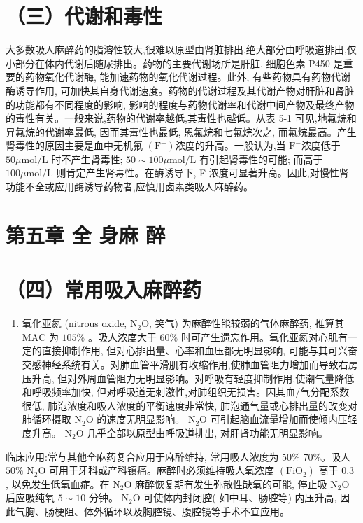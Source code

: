 \documentclass[10pt]{article}
\begin{document}
\section*{（三）代谢和毒性}
大多数吸人麻醉药的脂溶性较大,很难以原型由肾脏排出,绝大部分由呼吸道排出,仅小部分在体内代谢后随尿排出。药物的主要代谢场所是肝脏, 细胞色素 P450 是重要的药物氧化代谢酶, 能加速药物的氧化代谢过程。此外, 有些药物具有药物代谢酶诱导作用, 可加快其自身代谢速度。药物的代谢过程及其代谢产物对肝脏和肾脏的功能都有不同程度的影响, 影响的程度与药物代谢率和代谢中间产物及最终产物的毒性有关。一般来说,药物的代谢率越低,其毒性也越低。从表 5-1 可见,地氟烷和㫒氟烷的代谢率最低, 因而其毒性也最低, 恩氟烷和七氟烷次之, 而氟烷最高。产生肾毒性的原因主要是血中无机氟 $\left(\mathrm{F}^{-}\right)$浓度的升高。一般认为,当 $\mathrm{F}^{-}$浓度低于 $50 \mu \mathrm{mol} / \mathrm{L}$ 时不产生肾毒性; $50 \sim 100 \mu \mathrm{mol} / \mathrm{L}$ 有引起肾毒性的可能; 而高于 $100 \mu \mathrm{mol} / \mathrm{L}$ 则肯定产生肾毒性。在酶诱导下, F-浓度可显著升高。因此,对慢性肾功能不全或应用酶诱导药物者,应慎用卤素类吸人麻醉药。

\section*{第五章 全 身麻 醉}
\section*{（四）常用吸入麻醉药}
\begin{enumerate}
  \item 氧化亚氮 (nitrous oxide, $\mathrm{N}_{2} \mathrm{O}$, 笑气) 为麻醉性能较弱的气体麻醉药, 推算其 $\mathrm{MAC}$ 为 $105 \%$ 。吸人浓度大于 $60 \%$ 时可产生遗忘作用。氧化亚氮对心肌有一定的直接抑制作用, 但对心排出量、心率和血压都无明显影响, 可能与其可兴奋交感神经系统有关。对肺血管平滑肌有收缩作用,使肺血管阻力增加而导致右房压升高, 但对外周血管阻力无明显影响。对呼吸有轻度抑制作用,使潮气量降低和呼吸频率加快, 但对呼吸道无刺激性,对肺组织无损害。因其血/气分配系数很低, 肺泡浓度和吸人浓度的平衡速度非常快, 肺泡通气量或心排出量的改变对肺循环摄取 $\mathrm{N}_{2} \mathrm{O}$ 的速度无明显影响。 $\mathrm{N}_{2} \mathrm{O}$ 可引起脑血流量增加而使倾内压轻度升高。 $\mathrm{N}_{2} \mathrm{O}$ 几乎全部以原型由呼吸道排出, 对肝肾功能无明显影响。
\end{enumerate}

临床应用:常与其他全麻药复合应用于麻醉维持, 常用吸人浓度为 50\% 70\%。吸人 $50 \%$ $\mathrm{N}_{2} \mathrm{O}$ 可用于牙科或产科镇痛。麻醉时必须维持吸人氧浓度 $\left(\mathrm{FiO}_{2}\right)$ 高于 0.3 , 以免发生低氧血症。在 $\mathrm{N}_{2} \mathrm{O}$ 麻醉恢复期有发生弥散性缺氧的可能, 停止吸 $\mathrm{N}_{2} \mathrm{O}$ 后应吸纯氧 $5 \sim 10$ 分钟。 $\mathrm{N}_{2} \mathrm{O}$ 可使体内封闭腔( 如中耳、肠腔等) 内压升高, 因此气胸、肠梗阻、体外循环以及胸腔镜、腹腔镜等手术不宜应用。
\end{document}
